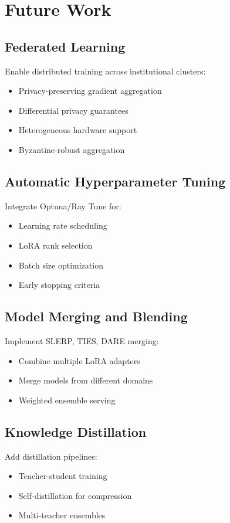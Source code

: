 \section{Future Work}


\subsection{Federated Learning}

Enable distributed training across institutional clusters:
\begin{itemize}
\item Privacy-preserving gradient aggregation
\item Differential privacy guarantees
\item Heterogeneous hardware support
\item Byzantine-robust aggregation
\end{itemize}

\subsection{Automatic Hyperparameter Tuning}

Integrate Optuna/Ray Tune for:
\begin{itemize}
\item Learning rate scheduling
\item LoRA rank selection
\item Batch size optimization
\item Early stopping criteria
\end{itemize}

\subsection{Model Merging and Blending}

Implement SLERP, TIES, DARE merging:
\begin{itemize}
\item Combine multiple LoRA adapters
\item Merge models from different domains
\item Weighted ensemble serving
\end{itemize}

\subsection{Knowledge Distillation}

Add distillation pipelines:
\begin{itemize}
\item Teacher-student training
\item Self-distillation for compression
\item Multi-teacher ensembles
\end{itemize}


